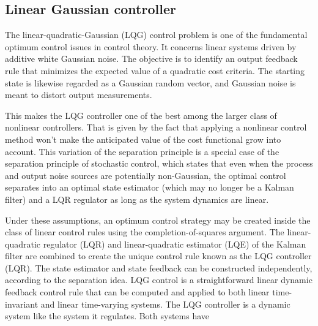 \documentclass[twocolumn,showpacs,
    nofootinbib,aps,superscriptaddress,
    eqsecnum,prd,showkeys,10pt,floatfix]{revtex4}
\begin{document}
\subsection{Linear Gaussian controller}
\par
The linear-quadratic-Gaussian (LQG) control problem is one of the fundamental
optimum control issues in control theory. It concerns linear systems driven by
additive white Gaussian noise. The objective is to identify an output feedback
rule that minimizes the expected value of a quadratic cost criteria. The
starting state is likewise regarded as a Gaussian random vector, and Gaussian
noise is meant to distort output measurements.
\par
This makes the LQG controller one of the best among the larger class of
nonlinear controllers. That is given by the fact that applying a nonlinear
control method won't make the anticipated value of the cost functional grow
into account. This variation of the separation principle is a special case of
the separation principle of stochastic control, which states that even when the
process and output noise sources are potentially non-Gaussian, the optimal
control separates into an optimal state estimator (which may no longer be a
Kalman filter) and a LQR regulator as long as the system dynamics are linear.
\par
Under these assumptions, an optimum control strategy may be created inside the
class of linear control rules using the completion-of-squares argument. The
linear-quadratic regulator (LQR) and linear-quadratic estimator (LQE) of the
Kalman filter are combined to create the unique control rule known as the LQG
controller (LQR). The state estimator and state feedback can be constructed
independently, according to the separation idea. LQG control is a
straightforward linear dynamic feedback control rule that can be computed and
applied to both linear time-invariant and linear time-varying systems. The LQG
controller is a dynamic system like the system it regulates. Both systems have
\end{document}
